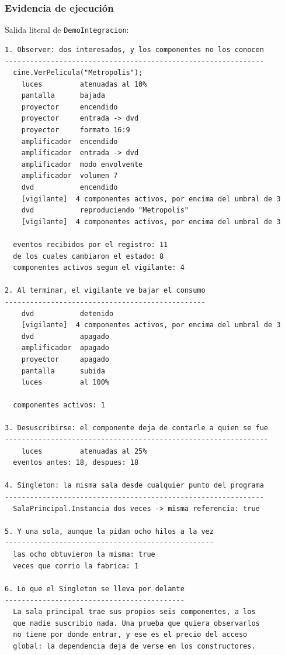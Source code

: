 \subsubsection*{Evidencia de ejecución}

Salida literal de \texttt{DemoIntegracion}:

{\footnotesize
\begin{verbatim}
1. Observer: dos interesados, y los componentes no los conocen
--------------------------------------------------------------
  cine.VerPelicula("Metropolis");
    luces         atenuadas al 10%
    pantalla      bajada
    proyector     encendido
    proyector     entrada -> dvd
    proyector     formato 16:9
    amplificador  encendido
    amplificador  entrada -> dvd
    amplificador  modo envolvente
    amplificador  volumen 7
    dvd           encendido
    [vigilante]  4 componentes activos, por encima del umbral de 3
    dvd           reproduciendo "Metropolis"
    [vigilante]  4 componentes activos, por encima del umbral de 3

  eventos recibidos por el registro: 11
  de los cuales cambiaron el estado: 8
  componentes activos segun el vigilante: 4

2. Al terminar, el vigilante ve bajar el consumo
------------------------------------------------
    dvd           detenido
    [vigilante]  4 componentes activos, por encima del umbral de 3
    dvd           apagado
    amplificador  apagado
    proyector     apagado
    pantalla      subida
    luces         al 100%

  componentes activos: 1

3. Desuscribirse: el componente deja de contarle a quien se fue
---------------------------------------------------------------
    luces         atenuadas al 25%
  eventos antes: 18, despues: 18

4. Singleton: la misma sala desde cualquier punto del programa
--------------------------------------------------------------
  SalaPrincipal.Instancia dos veces -> misma referencia: true

5. Y una sola, aunque la pidan ocho hilos a la vez
--------------------------------------------------
  las ocho obtuvieron la misma: true
  veces que corrio la fabrica: 1

6. Lo que el Singleton se lleva por delante
-------------------------------------------
  La sala principal trae sus propios seis componentes, a los
  que nadie suscribio nada. Una prueba que quiera observarlos
  no tiene por donde entrar, y ese es el precio del acceso
  global: la dependencia deja de verse en los constructores.
\end{verbatim}
}

